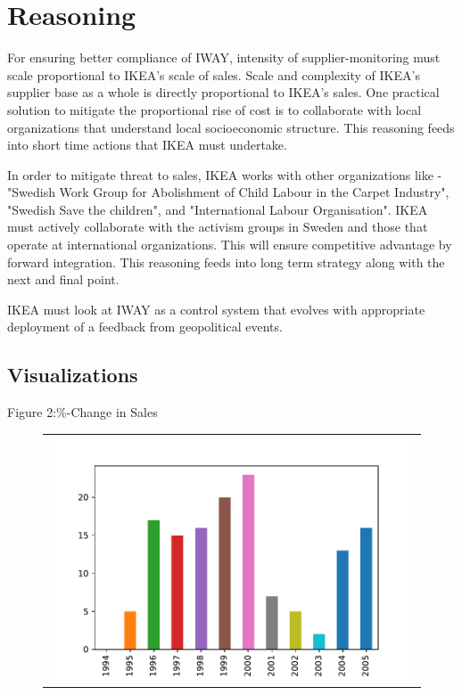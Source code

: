 \documentclass[a4paper, 11pt, margin=1in]{article}
\begin{document}
\section{Reasoning}
\begin{enumerate*}
\item For ensuring better compliance of IWAY, intensity of supplier-monitoring must scale proportional to IKEA's scale of sales. Scale and complexity of IKEA's supplier base as a whole is directly proportional to IKEA's sales. One practical solution to mitigate the proportional rise of cost is to collaborate with local organizations that understand local socioeconomic structure. This reasoning feeds into short time actions that IKEA must undertake.
\item In order to mitigate threat to sales, IKEA works with other organizations like - "Swedish Work Group for Abolishment of Child Labour in the Carpet Industry", "Swedish Save the children", and "International Labour Organisation"\cite{publichearing1998_479}. IKEA must actively collaborate with the activism groups in Sweden and those that operate at international organizations. This will ensure competitive advantage by forward integration. This reasoning feeds into long term strategy along with the next and final point.
\item IKEA must look at IWAY as a control system that evolves with appropriate deployment of a feedback from geopolitical events.
\end{enumerate*}




\subsection{Visualizations}

Figure 2:\%-Change in Sales\\

\begin{figure}[h]
   \centering
   \begin{tabular}{c}
       \includegraphics[page=1,width=.9\textwidth]{fig2.pdf} \\
   \end{tabular}
\end{figure}
\end{document}
